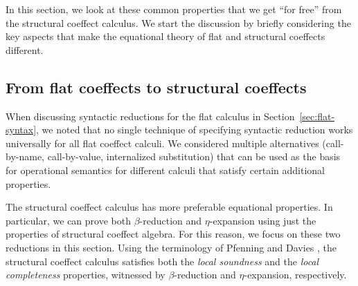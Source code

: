 In this section, we look at these common properties that we get ``for free'' from the structural 
coeffect calculus. We start the discussion by briefly considering the key aspects
that make the equational theory of flat and structural coeffects different.

\subsection{From flat coeffects to structural coeffects}
\label{sec:struct-syntax-intro}

When discussing syntactic reductions for the flat calculus in Section~\ref{sec:flat-syntax}, 
we noted that no single technique of specifying syntactic reduction works universally for all 
flat coeffect calculi. We considered multiple alternatives (call-by-name, call-by-value, 
internalized substitution) that can be used as the basis for operational semantics for
different calculi that satisfy certain additional properties. 

The structural coeffect calculus has more preferable equational properties. In particular, 
we can prove both $\beta$-reduction and $\eta$-expansion using just the properties of structural 
coeffect algebra. For this reason, we focus on these two reductions in this section.
Using the terminology of Pfenning and Davies \cite{logic-modal-reconstruction},
the structural coeffect calculus satisfies both the \emph{local soundness} and 
the \emph{local completeness} properties, witnessed by $\beta$-reduction and $\eta$-expansion,
respectively.


